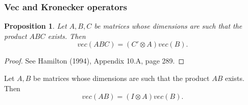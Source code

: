 \documentclass{beamer}
\newtheorem{prop}{Proposition}
\begin{document}
\begin{frame}
\frametitle{Vec and Kronecker operators}
\begin{prop}
	Let $ A,B,C $ be matrices whose dimensions are such that the product $ ABC $ exists. Then
	\begin{equation*}
	vec(ABC) = (C' \otimes A) vec(B).
	\end{equation*}
\end{prop}
\begin{proof}
	See Hamilton (1994), Appendix 10.A, page 289.
\end{proof}
\begin{corollary}
	Let $ A,B$ be matrices whose dimensions are such that the product $ AB $ exists. Then
	\begin{equation*}
	vec(AB) = (I \otimes A) vec(B).
	\end{equation*}
\end{corollary}
\hyperlink{kronBack}{}
\end{frame}

\addtocounter{framenumbervorappendix}{-\value{framenumber}} %
\addtocounter{framenumber}{\value{framenumbervorappendix}}
\end{document}
